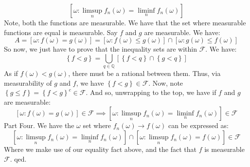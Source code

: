 \documentclass[12pt,a4paper]{article}
\newcommand{\1}[1]{\mathbbm{1}\left\{ #1 \right\}}
\newcommand{\Q}{\mathbb{Q}}
\newcommand{\fcal}{\mathcal{F}}
\begin{document}
$$
	\left[\omega : \limsup_n f_n(\omega) = \liminf_n f_n(\omega)\right]
$$
Note, both the functions are measurable. We have that the set where measurable functions are equal is measurable. Say $f$ and $g$ are measurable. We have:
$$
	A = \left[\omega : f(\omega) = g(\omega)\right] = 
	\left[\omega : f(\omega) \leq g(\omega)\right] \cap
	\left[\omega : g(\omega) \leq f(\omega)\right]
$$
So now, we just have to prove that the inequality sets are within $\fcal$. We have:
$$
	\left\{f < g\right\} = \bigcup_{q \in \Q} \left[\left\{f < q\right\} \cap \left\{g < q\right\}\right]
$$
As if $f(\omega) < g(\omega)$, there must be a rational between them. Thus, via measurability of $g$ and $f$, we have $\left\{f < g\right\} \in \fcal$. Now, note $\left\{g \leq f\right\} = \left\{f < g\right\}^c \in \fcal$. And so, unwrapping to the top, we have if $f$ and $g$ are measurable:
$$
	\left[\omega : f(\omega) = g(\omega)\right] \in \fcal \implies \left[\omega : \limsup_n f_n(\omega) = \liminf_n f_n(\omega)\right] \in \fcal
$$
Part Four. We have the $\omega$ set where $f_n(\omega) \to f(\omega)$ can be expressed as:
$$
	\left[\omega : \limsup_n f_n(\omega) = \liminf_n f_n(\omega)\right] \cap
	\left[\omega : \limsup_n f_n(\omega) = f(\omega)\right] \in \fcal
$$
Where we make use of our equality fact above, and the fact that $f$ is measurable $\fcal$. qed.
\end{document}

